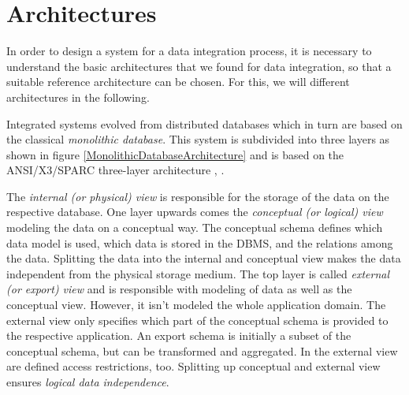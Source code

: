 \section{Architectures}

In order to design a system for a data integration process, it is necessary to understand the basic architectures that we found for data integration, so that a suitable reference architecture can be chosen. For this, we will different architectures in the following.


Integrated systems evolved from distributed databases which in turn are based on the classical \emph{monolithic database}. 
This system is subdivided into three layers as shown in figure \ref{MonolithicDatabaseArchitecture} and is based on the ANSI/X3/SPARC three-layer architecture \cite{TSICHRITZIS1978173}, \cite[p. 84/85]{DBLP:books/dp/LeserN2006}.

The \textit{internal (or physical) view} is responsible for the storage of the data on the respective database. 
One layer upwards comes the \textit{conceptual (or logical) view} modeling the data on a conceptual way. The conceptual schema defines which data model is used, which data is stored in the DBMS, and the relations among the data.
Splitting the data into the internal and conceptual view makes the data independent from the physical storage medium. The top layer is called \textit{external (or export) view} and is responsible with modeling of data as well as the conceptual view. However, it isn't modeled the whole application domain. The external view only specifies which part of the conceptual schema is provided to the respective application. An export schema is initially a subset of the conceptual schema, but can be transformed and aggregated. In the external view are defined access restrictions, too. Splitting up conceptual and external view ensures \textit{logical data independence}.


